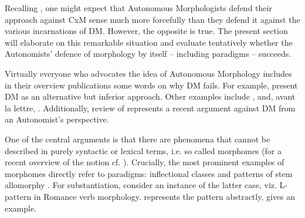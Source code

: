 \documentclass[output=paper]{langsci/langscibook}
\begin{document}
\begin{sloppypar}
Recalling , one might expect that Autonomous Morphologists defend their approach against CxM sense much more forcefully than they defend it against the various incarnations of DM. However, the opposite is true. The present section will elaborate on this remarkable situation and evaluate tentatively whether the Autonomists’ defence of morphology by itself – including paradigms – succeeds.
\end{sloppypar}

Virtually everyone who advocates the idea of Autonomous Morphology includes in their overview publications some words on why DM fails. For example, \citet[19–29]{BrownBrown2012} present DM as an alternative but inferior approach. Other examples include \citet[73–89]{Spencer2004}, \citet[194–195]{Aronoff2016} and, avant la lettre, \citet[82–85]{Aronoff1994}. Additionally,  review of \citet{Embick2015} represents a recent argument against DM from an Autonomist’s perspective.

One of the central arguments is that there are phenomena that cannot be described in purely syntactic or lexical terms, i.e. so called morphomes (for a recent overview of the notion cf. \citealt[160–166]{Enger2019}). Crucially, the most prominent examples of morphomes directly refer to paradigms: inflectional classes and patterns of stem allomorphy \citep{Maiden2009}. For substantiation, consider an instance of the latter case, viz.  L-pattern in Romance verb morphology.  represents the pattern abstractly,  gives an example.
\end{document}

